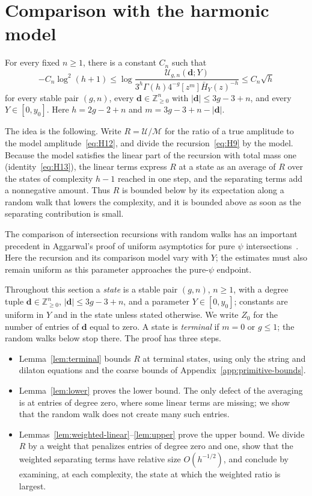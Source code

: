 \section{Comparison with the harmonic model}\label{uniform-comparison}

\begin{proposition}\label{prop:harmonic}
For every fixed \(n\ge1\), there is a constant \(C_n\) such that
\[
 -C_n\log^2(h+1)\le
 \log\frac{\mathcal U_{g,n}(\mathbf d;Y)}
 {3^h\Gamma(h)4^{-g}[z^m]\bar H_Y(z)^{-h}}
 \le C_n\sqrt h
\]
for every stable pair \((g,n)\), every \(\mathbf d\in\mathbb Z_{\ge0}^n\)
with \(|\mathbf d|\le3g-3+n\), and every \(Y\in[0,y_0]\). Here
\(h=2g-2+n\) and \(m=3g-3+n-|\mathbf d|\).
\end{proposition}
The idea is the following. Write \(R=\mathcal U/\mathcal M\) for the
ratio of a true amplitude to the model amplitude~\eqref{eq:H12}, and
divide the recursion~\eqref{eq:H9} by the model. Because the model
satisfies the linear part of the recursion with total mass one
(identity~\eqref{eq:H13}), the linear terms express \(R\) at a state as an
average of \(R\) over the states of complexity \(h-1\) reached in one step,
and the separating terms add a nonnegative amount. Thus \(R\) is bounded
below by its expectation along a random walk that lowers the complexity,
and it is bounded above as soon as the separating contribution is small.

The comparison of intersection recursions with random walks has an
important precedent in Aggarwal's proof of uniform asymptotics for pure
$\psi$ intersections~\cite{Agg}. Here the recursion and its comparison
model vary with $Y$; the estimates must also remain uniform as this
parameter approaches the pure-$\psi$ endpoint.

Throughout this section a \emph{state} is a stable pair \((g,n)\), \(n\ge1\),
with a degree tuple \(\mathbf d\in\mathbb Z_{\ge0}^n\), \(|\mathbf d|\le3g-3+n\),
and a parameter \(Y\in[0,y_0]\); constants are uniform in \(Y\) and in the
state unless stated otherwise. We write \(Z_0\) for the number of entries
of \(\mathbf d\) equal to zero. A state is \emph{terminal} if \(m=0\) or
\(g\le1\); the random walks below stop there. The proof has three steps.
\begin{itemize}[leftmargin=*]
\item Lemma~\ref{lem:terminal} bounds \(R\) at terminal states, using only
the string and dilaton equations and the coarse bounds of
Appendix~\ref{app:primitive-bounds}.
\item Lemma~\ref{lem:lower} proves the lower bound. The only defect of the
averaging is at entries of degree zero, where some linear terms are
missing; we show that the random walk does not create many such entries.
\item Lemmas~\ref{lem:weighted-linear}--\ref{lem:upper} prove the upper
bound. We divide \(R\) by a weight that penalizes entries of degree zero
and one, show that the weighted separating terms have relative size
\(O(h^{-1/2})\), and conclude by examining, at each complexity, the state
at which the weighted ratio is largest.
\end{itemize}

